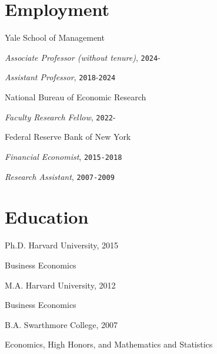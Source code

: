 \documentclass[letterpaper]{article}
\renewenvironment{itemize}{
  \begin{list}{}
    { \setlength{\itemsep}{5pt}
      \setlength{\parsep}{0pt}
      \setlength{\topsep}{0pt}
      \setlength{\leftmargin}{0em} } }{
  \end{list}}
\begin{document}
\section*{Employment}
\begin{itemize}
	\item Yale School of Management
	      \begin{itemize}
		      \item \qquad \textit{Associate Professor (without tenure)}, \texttt{2024}-
		      \item \qquad \textit{Assistant Professor}, \texttt{2018}-\texttt{2024}
	      \end{itemize}
	\item National Bureau of Economic Research
	      \begin{itemize}
		      \item \qquad \textit{Faculty Research Fellow}, \texttt{2022}-
	      \end{itemize}
	\item Federal Reserve Bank of New York
	      \begin{itemize}
		      \item \qquad \textit{Financial Economist}, \texttt{2015-2018}
		      \item \qquad \textit{Research Assistant}, \texttt{2007-2009}
	      \end{itemize}
\end{itemize}

\section*{Education}

\begin{itemize}
	\item Ph.D. Harvard University, 2015
	      \begin{itemize}
		      \item Business Economics
	      \end{itemize}
	\item M.A. Harvard University, 2012
	      \begin{itemize}
		      \item Business Economics
	      \end{itemize}
	\item B.A. Swarthmore College, 2007
	      \begin{itemize}
		      \item Economics, High Honors, and Mathematics and Statistics
	      \end{itemize}
\end{itemize}
\end{document}
